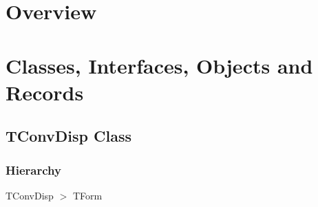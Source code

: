 \documentclass{report}
\newif\ifpdf
\begin{document}
\section{Overview}
\begin{description}
\item[\texttt{\begin{ttfamily}TConvDisp\end{ttfamily} Class}]
\end{description}
\section{Classes, Interfaces, Objects and Records}
\ifpdf
\subsection*{\large{\textbf{TConvDisp Class}}\normalsize\hspace{1ex}\hrulefill}
\else
\subsection*{TConvDisp Class}
\fi
\label{pkgconvertdisp.TConvDisp}
\subsubsection*{\large{\textbf{Hierarchy}}\normalsize\hspace{1ex}\hfill}
TConvDisp {$>$} TForm
\end{document}

